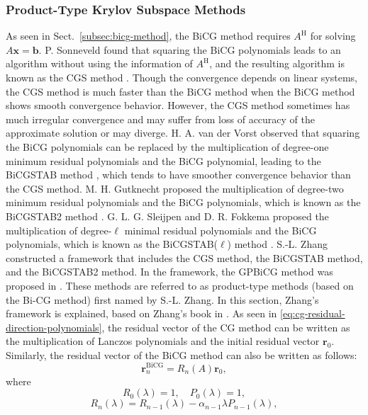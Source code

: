 \subsubsection{{Product-Type Krylov Subspace Methods}}\label{subsec:product-type-krylov}
{As seen in Sect.\ \ref{subsec:bicg-method}, the BiCG method requires $A^{\mathrm H}$ for solving $A\bm x=\bm b$. P. Sonneveld found that squaring the BiCG polynomials leads to an algorithm without using the information of $A^{\mathrm H}$, and the resulting algorithm is known as the CGS method . Though the convergence depends on linear systems, the CGS method is much faster than the BiCG method when the BiCG method shows smooth convergence behavior. However, the CGS method sometimes has much irregular convergence and may suffer from loss of accuracy of the approximate solution or may diverge. H. A. van der Vorst observed that squaring the BiCG polynomials can be replaced by the multiplication of degree-one minimum residual polynomials and the BiCG polynomial, leading to the BiCGSTAB method , which tends to have smoother convergence behavior than the CGS method. M. H. Gutknecht proposed the multiplication of degree-two minimum residual polynomials and the BiCG polynomials, which is known as the BiCGSTAB2 method . G. L. G. Sleijpen and D. R. Fokkema proposed the multiplication of degree-$\ell$ minimal residual polynomials and the BiCG polynomials, which is known as the BiCGSTAB($\ell$) method . S.-L. Zhang constructed a framework that includes the CGS method, the BiCGSTAB method, and the BiCGSTAB2 method. In the framework, the GPBiCG method was proposed in . These methods are referred to as product-type methods (based on the Bi-CG method) first named by S.-L. Zhang.}
{In this section, Zhang's framework is explained, based on Zhang's book in .}
{As seen in \eqref{eq:cg-residual-direction-polynomials}, the residual vector of the CG method can be written as the multiplication of Lanczos polynomials and the initial residual vector $\bm r_0$. Similarly, the residual vector of the BiCG method can also be written as follows:}
\[\bm r_n^{\mathrm{BiCG}}=R_n(A)\bm r_0,\]
{where}
\begin{equation}\label{eq:product-bicg-polynomials-initial}R_0(\lambda)=1,\quad P_0(\lambda)=1,\end{equation}
\begin{equation}\label{eq:product-bicg-residual-polynomial}R_n(\lambda)=R_{n-1}(\lambda)-\alpha_{n-1}\lambda P_{n-1}(\lambda),\end{equation}
